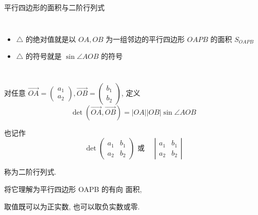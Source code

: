 \documentclass[10pt,punct]{ctexbeamer}
\begin{document}
\begin{frame}{平行四边形的面积与二阶行列式}
\begin{columns}[c]
        \pause
        \begin{itemize}
            \item  $\triangle$ 的\alert{绝对值}就是以 $O A, O B$ 为一组邻边的平行四边形 $O A P B$ 的面积 $S_{O A P B}$
            \item   $\triangle$ 的\alert{符号}就是 $\sin \angle A O B$ 的符号
        \end{itemize}


    \end{columns}



\end{frame}

\begin{frame}


    对任意 $\overrightarrow{O A}=\left(\begin{array}{l}a_1 \\ a_2\end{array}\right), \overrightarrow{O B}=\left(\begin{array}{l}b_1 \\ b_2\end{array}\right)$, 定义 $$\operatorname{det}(\overrightarrow{O A}, \overrightarrow{O B})=|O A||O B| \sin \angle A O B$$

    也记作
    $$\operatorname{det}\left(\begin{array}{ll}a_1 & b_1 \\ a_2 & b_2\end{array}\right) \mbox{ 或  } \quad \left|\begin{array}{ll}a_1 & b_1 \\ a_2 & b_2\end{array}\right|$$


    称为\alert{二阶行列式}.

    将它理解为平行四边形 OAPB 的\alert{有向 面积},

    取值既可以为正实数, 也可以取负实数或零.
\end{frame}
\end{document}
